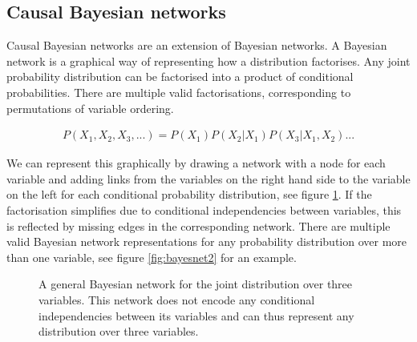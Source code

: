 \documentclass[11pt,a4paper,twoside]{report}
\newcommand{\eqn}[1]{\begin{align}#1\end{align}}
\theoremstyle{plain}
\theoremstyle{definition}
\begin{document}
\subsection{Causal Bayesian networks}

Causal Bayesian networks are an extension of Bayesian networks. A Bayesian network is a graphical way of representing how a distribution factorises. Any joint probability distribution can be factorised into a product of conditional probabilities. There are multiple valid factorisations, corresponding to permutations of variable ordering.

\eqn{
\label{eqn:cbn:joint_dist}
P(X_{1},X_{2},X_{3},...)=P(X_{1})P(X_{2}|X_{1})P(X_{3}|X_{1},X_{2})...
}

We can represent this graphically by drawing a network with a node for each variable and adding links from the variables on the right hand side to the variable on the left for each conditional probability distribution, see figure \ref{fig:bayesnet}. If the factorisation simplifies due to conditional independencies between variables, this is reflected by missing edges in the corresponding network. There are multiple valid Bayesian network representations for any probability distribution over more than one variable, see figure \ref{fig:bayesnet2} for an example. 

\begin{figure}[ht]
\centering
{}
\caption{A general Bayesian network for the joint distribution over three variables. This network does not encode any conditional independencies between its variables and can thus represent any distribution over three variables.}
\label{fig:bayesnet}
\end{figure}
\end{document}
